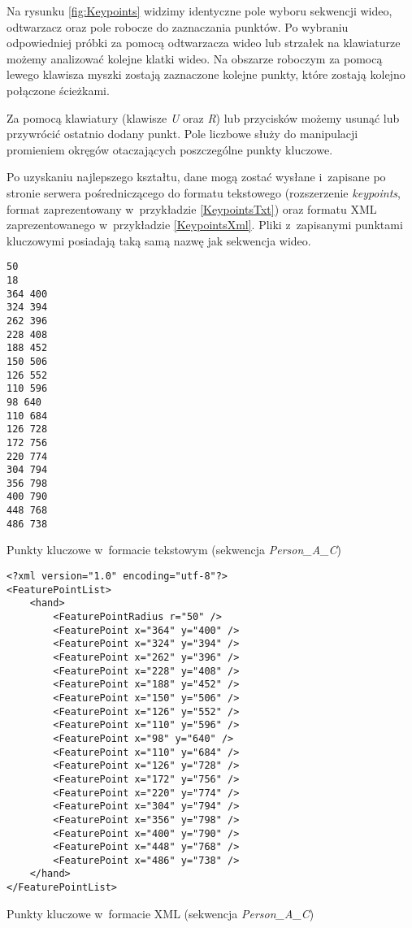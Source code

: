     Na rysunku \ref{fig:Keypoints} widzimy identyczne pole wyboru sekwencji wideo, odtwarzacz oraz pole robocze do zaznaczania punktów. Po wybraniu odpowiedniej próbki za pomocą odtwarzacza wideo lub strzałek na klawiaturze możemy analizować kolejne klatki wideo. Na obszarze roboczym za pomocą lewego klawisza myszki zostają zaznaczone kolejne punkty, które zostają kolejno połączone ścieżkami.

    Za pomocą klawiatury (klawisze \textit{U} oraz \textit{R}) lub przycisków możemy usunąć lub przywrócić ostatnio dodany punkt. Pole liczbowe służy do manipulacji promieniem okręgów otaczających poszczególne punkty kluczowe.

    Po uzyskaniu najlepszego kształtu, dane mogą zostać wysłane i~zapisane po stronie serwera pośredniczącego do formatu tekstowego (rozszerzenie \textit{keypoints}, format zaprezentowany w~przykładzie \ref{KeypointsTxt}) oraz formatu XML zaprezentowanego w~przykładzie \ref{KeypointsXml}. Pliki z~zapisanymi punktami kluczowymi posiadają taką samą nazwę jak sekwencja wideo.

      \begin{sample}[ht]
        \begin{verbatim}
50
18
364 400
324 394
262 396
228 408
188 452
150 506
126 552
110 596
98 640
110 684
126 728
172 756
220 774
304 794
356 798
400 790
448 768
486 738
        \end{verbatim}
        \caption{Punkty kluczowe w~formacie tekstowym (sekwencja \textit{Person\_A\_C})}
        \label{KeypointsTxt}
      \end{sample}

    \newpage
      \begin{sample}[ht]
        \begin{verbatim}
<?xml version="1.0" encoding="utf-8"?>
<FeaturePointList>
    <hand>
        <FeaturePointRadius r="50" />
        <FeaturePoint x="364" y="400" />
        <FeaturePoint x="324" y="394" />
        <FeaturePoint x="262" y="396" />
        <FeaturePoint x="228" y="408" />
        <FeaturePoint x="188" y="452" />
        <FeaturePoint x="150" y="506" />
        <FeaturePoint x="126" y="552" />
        <FeaturePoint x="110" y="596" />
        <FeaturePoint x="98" y="640" />
        <FeaturePoint x="110" y="684" />
        <FeaturePoint x="126" y="728" />
        <FeaturePoint x="172" y="756" />
        <FeaturePoint x="220" y="774" />
        <FeaturePoint x="304" y="794" />
        <FeaturePoint x="356" y="798" />
        <FeaturePoint x="400" y="790" />
        <FeaturePoint x="448" y="768" />
        <FeaturePoint x="486" y="738" />
    </hand>
</FeaturePointList>
        \end{verbatim}
        \caption{Punkty kluczowe w~formacie XML (sekwencja \textit{Person\_A\_C})}
        \label{KeypointsXml}
      \end{sample}



